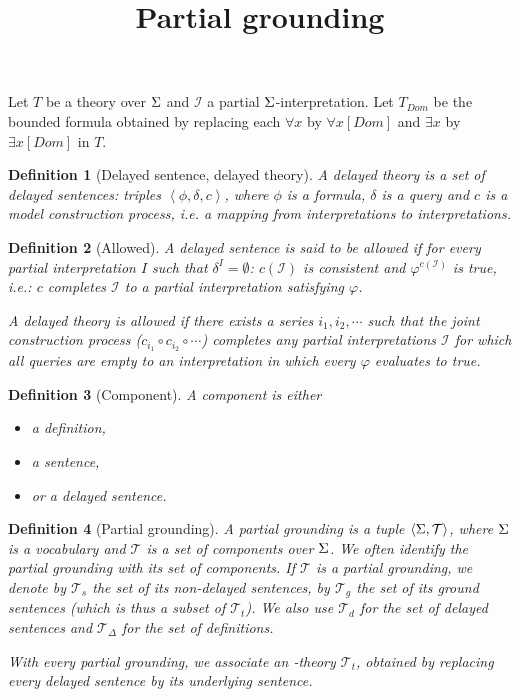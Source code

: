 \documentclass{article}
\title{Partial grounding}
\date{}
\newcommand{\I}{\mathcal{I}}
\newcommand{\seq}[1]{\left\langle#1\right\rangle}
\newcommand{\T}{\mathcal{T}}
\newcommand{\Tt}{\mathcal{T}_t}
\newcommand{\Ts}{\mathcal{T}_s}
\newcommand{\Tg}{\mathcal{T}_g}
\newcommand{\Td}{\mathcal{T}_d}
\newcommand{\Tdef}{\mathcal{T}_\Delta}
\newcommand{\pg}{\seq{\voc,\T}}
\newtheorem{definition}{Definition}
\begin{document}
\maketitle

Let $T$ be a theory over $\Sigma$ and $\I$ a partial $\Sigma$-interpretation.
Let $T_{Dom}$ be the bounded formula obtained by replacing each $\forall x$ by $\forall x[Dom]$ and $\exists x$ by $\exists x[Dom]$ in $T$.

\begin{definition}[Delayed sentence, delayed theory]
	A delayed theory is a set of delayed sentences: triples $\left\langle \phi, \delta, c \right\rangle$, where $\phi$ is a formula, $\delta$ is a query and $c$ is a model construction process, i.e. a mapping from interpretations to interpretations.
\end{definition}

\begin{definition}[Allowed]
	A delayed sentence is said to be \textit{allowed} if for every partial interpretation $I$ such that $\delta^I = \emptyset$: $c(\I)$ is consistent and $\varphi^{c(\I)}$ is true, i.e.: $c$ completes $\I$ to a partial interpretation satisfying $\varphi$.

	A delayed theory is \textit{allowed} if there exists a series $i_1, i_2,\cdots$ such that the joint construction process ($c_{i_1} \circ c_{i_2} \circ \cdots$) completes any partial interpretations $\I$ for which all queries are empty to an interpretation in which every $\varphi$ evaluates to true.
\end{definition}

\begin{definition}[Component]
A \textit{component} is either
\begin{itemize}
\item a definition,
\item a sentence,
\item or a delayed sentence.
\end{itemize}
\end{definition}

\begin{definition}[Partial grounding]
	A partial grounding  is a tuple $\pg$, where $\Sigma$ is a vocabulary and $\T$ is a set of components over $\Sigma$. We often identify the partial grounding with its set of components. If $\T$ is a partial grounding, we denote by $\Ts$ the set of its non-delayed sentences, by $\Tg$ the set of its ground sentences (which is thus a subset of $\Tt$). We also use $\Td$ for the set of delayed sentences and $\Tdef$ for the set of definitions. 

With every partial grounding, we associate an \fodot-theory $\Tt$, obtained by replacing every delayed sentence by its underlying sentence.
\end{definition}
\end{document}
